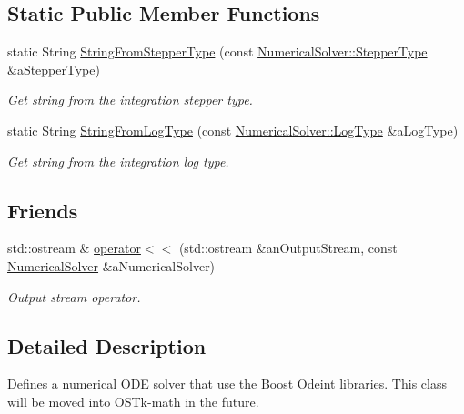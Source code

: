 \subsection*{Static Public Member Functions}
\begin{DoxyCompactItemize}
\item 
static String \hyperlink{classostk_1_1astro_1_1_numerical_solver_a3dd4e9b6acffec931c3748d4d851155b}{String\+From\+Stepper\+Type} (const \hyperlink{classostk_1_1astro_1_1_numerical_solver_afb80f81b2c3cc1d356b0b4749e45b947}{Numerical\+Solver\+::\+Stepper\+Type} \&a\+Stepper\+Type)
\begin{DoxyCompactList}\small\item\em Get string from the integration stepper type. \end{DoxyCompactList}\item 
static String \hyperlink{classostk_1_1astro_1_1_numerical_solver_ab75ca02c5e4d0b2b2390045c353bf66f}{String\+From\+Log\+Type} (const \hyperlink{classostk_1_1astro_1_1_numerical_solver_a23e9e3f7d630f3097b4cbd91d9a2aa4c}{Numerical\+Solver\+::\+Log\+Type} \&a\+Log\+Type)
\begin{DoxyCompactList}\small\item\em Get string from the integration log type. \end{DoxyCompactList}\end{DoxyCompactItemize}
\subsection*{Friends}
\begin{DoxyCompactItemize}
\item 
std\+::ostream \& \hyperlink{classostk_1_1astro_1_1_numerical_solver_a28e4d7a66856d0bedb035589eb5e70f7}{operator$<$$<$} (std\+::ostream \&an\+Output\+Stream, const \hyperlink{classostk_1_1astro_1_1_numerical_solver}{Numerical\+Solver} \&a\+Numerical\+Solver)
\begin{DoxyCompactList}\small\item\em Output stream operator. \end{DoxyCompactList}\end{DoxyCompactItemize}


\subsection{Detailed Description}
Defines a numerical O\+DE solver that use the Boost Odeint libraries. This class will be moved into O\+S\+Tk-\/math in the future. 

